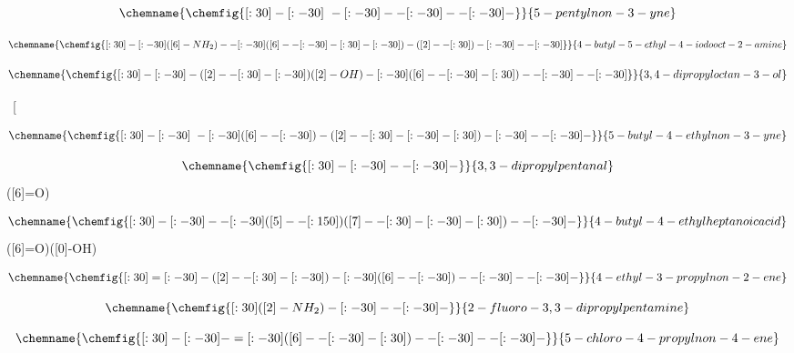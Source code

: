\documentclass[pra,11pt,aps]{revtex4-1}
\begin{document}
\[\chemname{\chemfig{[:30]-[:-30]~-[:-30]--[:-30]--[:-30]-}}{5-pentylnon-3-yne}\]

\vspace{0.75in}

\[\chemname{\chemfig{[:30]-[:-30]([6]-NH_2)--[:-30]([6]--[:-30]-[:30]-[:-30])-([2]--[:30])-[:-30]--[:-30]}}{4-butyl-5-ethyl-4-iodooct-2-amine}\]

\vspace{0.75in}

\[\chemname{\chemfig{[:30]-[:-30]-([2]--[:30]-[:-30])([2]-OH)-[:-30]([6]--[:-30]-[:30])--[:-30]--[:-30]}}{3,4-dipropyloctan-3-ol}\]

\vspace{0.75in}

~[\]

\vspace{0.75in}

\[\chemname{\chemfig{[:30]-[:-30]~-[:-30]([6]--[:-30])-([2]--[:30]-[:-30]-[:30])-[:-30]--[:-30]-}}{5-butyl-4-ethylnon-3-yne}\]

\vspace{0.75in}

\[\chemname{\chemfig{[:30]-[:-30]--[:-30]-}}{3,3-dipropylpentanal}\]([6]=O)

\vspace{0.75in}

\[\chemname{\chemfig{[:30]-[:-30]--[:-30]([5]--[:150])([7]--[:30]-[:-30]-[:30])--[:-30]-}}{4-butyl-4-ethylheptanoic acid}\]([6]=O)([0]-OH)

\vspace{0.75in}

\[\chemname{\chemfig{[:30]=[:-30]-([2]--[:30]-[:-30])-[:-30]([6]--[:-30])--[:-30]--[:-30]-}}{4-ethyl-3-propylnon-2-ene}\]

\vspace{0.75in}

\[\chemname{\chemfig{[:30]([2]-NH_2)-[:-30]--[:-30]-}}{2-fluoro-3,3-dipropylpentamine}\]

\vspace{0.75in}

\[\chemname{\chemfig{[:30]-[:-30]-=[:-30]([6]--[:-30]-[:30])--[:-30]--[:-30]-}}{5-chloro-4-propylnon-4-ene}\]

\vspace{0.75in}
\end{document}
